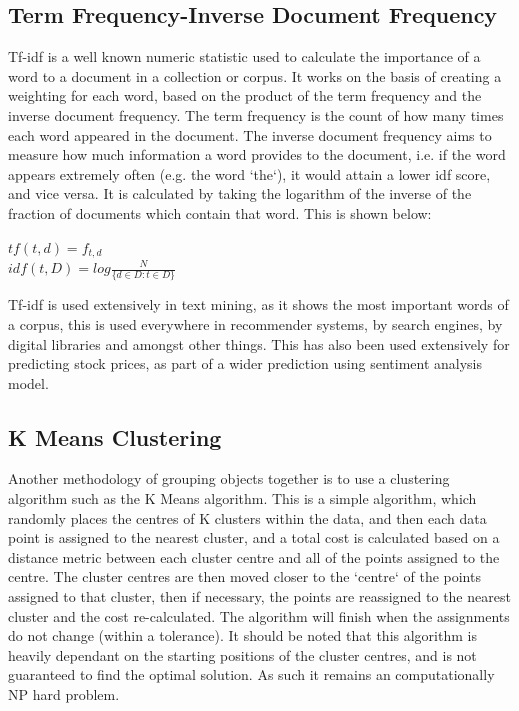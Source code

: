  \subsection{Term Frequency-Inverse Document Frequency}
 Tf-idf is a well known numeric statistic used to calculate the importance of a word to a document in a collection or corpus. It works on the basis of creating a weighting for each word, based on the product of the term frequency and the inverse document frequency. The term frequency is the count of how many times each word appeared in the document. The inverse document frequency aims to measure how much information a word provides to the document, i.e. if the word appears extremely often (e.g. the word `the`), it would attain a lower idf score, and vice versa. It is calculated by taking the logarithm of the inverse of the fraction of documents which contain that word. This is shown below:
 
 \begin{center}
 	$tf(t,d) = f_{t,d}$\\
 	$idf(t, D) = log\frac{N}{\{d \in D : t \in D\}}$
 \end{center}
 
 Tf-idf is used extensively in text mining, as it shows the most important words of a corpus, this is used everywhere in recommender systems, by search engines, by digital libraries and amongst other things. This has also been used extensively for predicting stock prices, as part of a wider prediction using sentiment analysis model. 
 
 
\subsection{K Means Clustering}
Another methodology of grouping objects together is to use a clustering algorithm such as the K Means algorithm. This is a simple algorithm, which randomly places the centres of K clusters within the data, and then each data point is assigned to the nearest cluster, and a total cost is calculated based on a distance metric between each cluster centre and all of the points assigned to the centre. The cluster centres are then moved closer to the `centre` of the points assigned to that cluster, then if necessary, the points are reassigned to the nearest cluster and the cost re-calculated. The algorithm will finish when the assignments do not change (within a tolerance). It should be noted that this algorithm is heavily dependant on the starting positions of the cluster centres, and is not guaranteed to find the optimal solution. As such it remains an computationally NP hard problem. 

